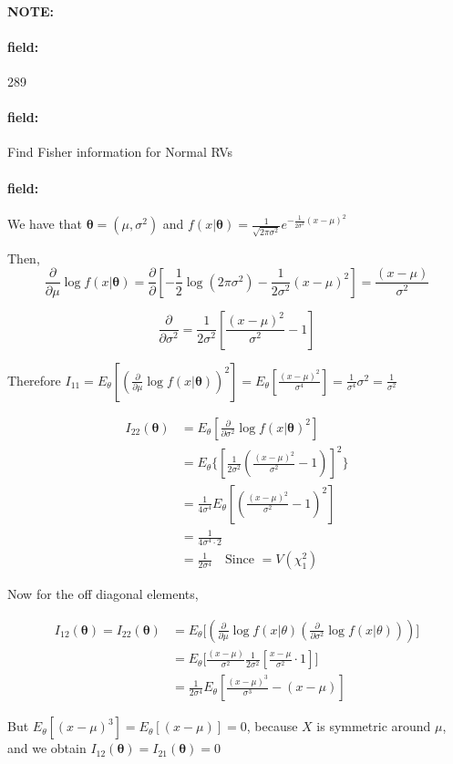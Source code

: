 \documentclass[12pt]{article}
\newenvironment{note}{\paragraph{NOTE:}}{}
\newenvironment{field}{\paragraph{field:}}{}
\begin{document}
\begin{note} \begin{field} \tiny 289 \end{field}
  \begin{field}
    Find Fisher information for Normal RVs
  \end{field}
  \begin{field}
    We have that $\boldsymbol\theta = (\mu,\sigma^2)$ and $f(x|\boldsymbol\theta) = \frac{1}{\sqrt{2\pi\sigma^2}}e^{-\frac{1}{2\sigma^2}(x - \mu)^2}$

    Then,
    $$ \frac{\partial}{\partial \mu} \log f(x|\boldsymbol\theta) = \frac{\partial}{\partial}[-\frac{1}{2}\log(2\pi\sigma^2) - \frac{1}{2\sigma^2}(x - \mu)^2] = \frac{(x-\mu)}{\sigma^2}$$

    $$ \frac{\partial}{\partial\sigma^2} = \frac{1}{2\sigma^2}[ \frac{(x-\mu)^2}{\sigma^2} - 1]$$

    Therefore $I_{11} = E_\theta[(\frac{\partial}{\partial \mu}\log f(x|\boldsymbol\theta))^2] = E_\theta[\frac{(x-\mu)^2}{\sigma^4}] = \frac{1}{\sigma^4}\sigma^2 = \frac{1}{\sigma^2}$

    \begin{align*}
      I_{22}(\boldsymbol\theta) &= E_{\theta}[\frac{\partial}{\partial\sigma^2}\log f(x|\boldsymbol\theta)^2]\\
      &= E_\theta \big\{ [ \frac{1}{2\sigma^2} ( \frac{(x-\mu)^2}{\sigma^2} - 1)]^2\big\}\\
      &= \frac{1}{4\sigma^4}E_\theta[ (\frac{(x-\mu)^2}{\sigma^2} - 1)^2]\\
      &= \frac{1}{4\sigma^4 \cdot 2} \\
      &= \frac{1}{2\sigma^4} \quad \text{Since } = V(\chi^2_1)
    \end{align*}

    Now for the off diagonal elements,

    \begin{align*}
      I_{12}(\boldsymbol\theta) = I_{22}(\boldsymbol\theta) &= E_\theta \big[ ( \frac{\partial{}{}}{\partial{\mu}{}}\log f(x|\theta)(\frac{\partial{}{}}{\partial{\sigma^2}{    }} \log f(x|\theta)))\big]\\
      &=E_\theta \big[ \frac{(x-\mu)}{\sigma^2
      } \frac{1}{2\sigma^2} [\frac{x-\mu}{\sigma^2}\cdot 1]\big]\\
      &= \frac{1}{2\sigma^4} E_\theta[ \frac{(x-\mu)^3}{\sigma^3} - (x-\mu)]
    \end{align*}

    But $E_\theta[(x-\mu)^3] = E_\theta[(x - \mu)] = 0$, because $X$ is symmetric around $\mu$, and we obtain $I_{12}(\boldsymbol\theta) = I_{21}(\boldsymbol\theta) = 0$


\end{field}
\end{note}
\end{document}
